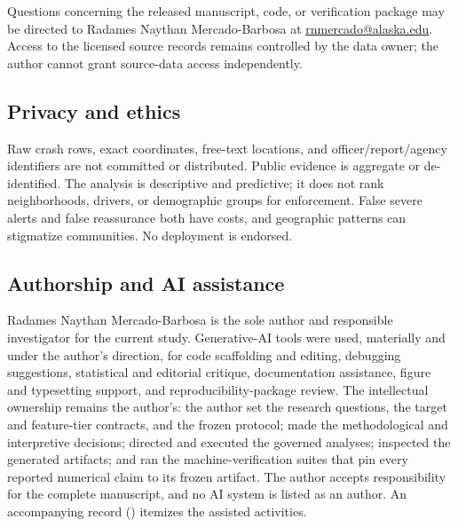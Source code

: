 \documentclass[11pt,letterpaper]{article}
\newcommand{\artifact}[1]{\begingroup\urlstyle{tt}\path{#1}\endgroup}
\begin{document}
Questions concerning the released manuscript, code, or verification package may be directed to Radames Naythan Mercado-Barbosa at \url{rnmercado@alaska.edu}. Access to the licensed source records remains controlled by the data owner; the author cannot grant source-data access independently.

\subsection{Privacy and ethics}
Raw crash rows, exact coordinates, free-text locations, and officer/report/agency identifiers are not committed or distributed. Public evidence is aggregate or de-identified. The analysis is descriptive and predictive; it does not rank neighborhoods, drivers, or demographic groups for enforcement. False severe alerts and false reassurance both have costs, and geographic patterns can stigmatize communities. No deployment is endorsed.

\subsection{Authorship and AI assistance}
Radames Naythan Mercado-Barbosa is the sole author and responsible investigator for the current study. Generative-AI tools were used, materially and under the author's direction, for code scaffolding and editing, debugging suggestions, statistical and editorial critique, documentation assistance, figure and typesetting support, and reproducibility-package review. The intellectual ownership remains the author's: the author set the research questions, the target and feature-tier contracts, and the frozen protocol; made the methodological and interpretive decisions; directed and executed the governed analyses; inspected the generated artifacts; and ran the machine-verification suites that pin every reported numerical claim to its frozen artifact. The author accepts responsibility for the complete manuscript, and no AI system is listed as an author. An accompanying record (\artifact{paper/AI_USE_AND_PRIVACY.md}) itemizes the assisted activities.
\end{document}
